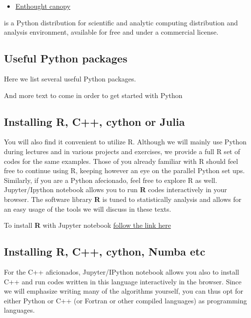 \documentclass[%
oneside,                 %
final,                   %
10pt]{article}
\begin{document}
\begin{itemize}
\item \href{{https://www.enthought.com/product/canopy/}}{Enthought canopy} 
\end{itemize}

\noindent
is a Python
distribution for scientific and analytic computing distribution and
analysis environment, available for free and under a commercial
license.

\subsection{Useful Python packages}
Here we list several useful Python packages.

And more text to come in order to get started with Python


\subsection{Installing R, C++, cython or Julia}

You will also find it convenient to utilize R. Although we will mainly
use Python during lectures and in various projects and exercises, we
provide a full R set of codes for the same examples. Those of you
already familiar with R should feel free to continue using R, keeping
however an eye on the parallel Python set ups. Similarly, if you are a
Python afecionado, feel free to explore R as well.  Jupyter/Ipython
notebook allows you to run \textbf{R} codes interactively in your
browser. The software library \textbf{R} is tuned to statistically analysis
and allows for an easy usage of the tools we will discuss in these
texts.

To install \textbf{R} with Jupyter notebook 
\href{{https://mpacer.org/maths/r-kernel-for-ipython-notebook}}{follow the link here}




\subsection{Installing R, C++, cython, Numba etc}


For the C++ aficionados, Jupyter/IPython notebook allows you also to
install C++ and run codes written in this language interactively in
the browser. Since we will emphasize writing many of the algorithms
yourself, you can thus opt for either Python or C++ (or Fortran or other compiled languages) as programming
languages.
\end{document}
